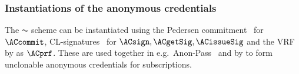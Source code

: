 {}


\subsubsection{Instantiations of the anonymous credentials} 

The \(\AC\) scheme can be instantiated using the Pedersen 
commitment~\cite{PedersenCommitment} for \(\ACcommit\),
CL-signatures~\cite{CLsignatures} for \(\ACsign, \ACgetSig, \ACissueSig\) and
the \ac{VRF} by \citet{DY-VRF} as \(\ACprf\).
These are used together in e.g.\ Anon-Pass~\cite{AnonPass} and by 
\citet{HowToWinTheCloneWars} to form unclonable anonymous credentials for 
subscriptions.
